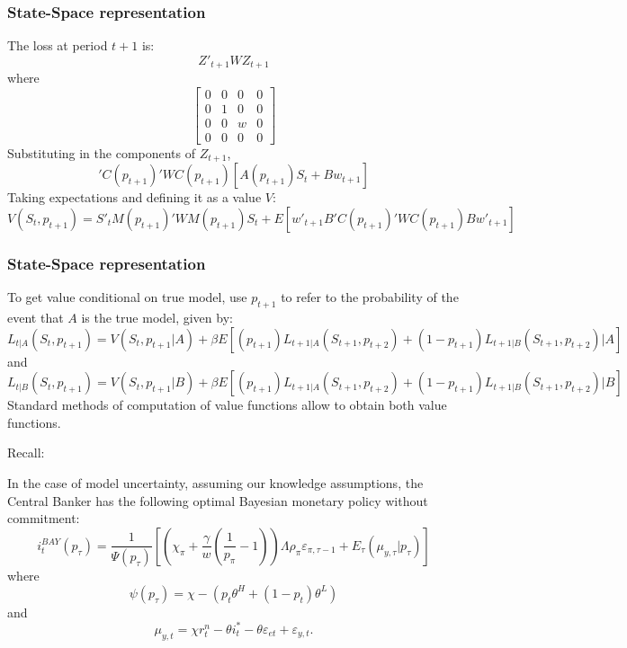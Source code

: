 \documentclass{beamer}
\begin{document}
\begin{frame}
\frametitle{State-Space representation} 
The loss at period $t+1$ is:
\begin{equation}
Z'_{t+1} W Z_{t+1}
\end{equation}
where
\begin{equation}
\begin{bmatrix}
0 & 0 & 0 & 0 \\
0 & 1 & 0 & 0 \\
0 & 0 & w & 0 \\
0 & 0 & 0 & 0
\end{bmatrix}
\end{equation}
Substituting in the components of $Z_{t+1}$,
\begin{equation}
[A ( p_{t+1}) S_t + B w_{t+1}]' C(p_{t+1})' W C (p_{t+1}) [A(p_{t+1}) S_t + B w_{t+1}]
\end{equation}
Taking expectations and defining it as a value $V$:
\small
\begin{equation}
V(S_t, p_{t+1}) = S'_t M (p_{t+1})' W M (p_{t+1}) S_t + E \left [w'_{t+1} B' C (p_{t+1})' W C (p_{t+1}) B w'_{t+1} \right ]
\end{equation}
\end{frame}

\begin{frame}
\frametitle{State-Space representation} 
To get value conditional on true model, use $p_{t+1}$ to refer to the
probability of the event that $A$ is the true model, given by:
\tiny
\begin{equation}
L_{t|A} (S_t,p_{t+1}) = V(S_t,p_{t+1}|A) + \beta E \left [(p_{t+1}) L_{t+1|A} (S_{t+1},p_{t+2}) + (1-p_{t+1}) L_{t+1|B} (S_{t+1},p_{t+2})|A \right ]
\end{equation}
\small and
\tiny
\begin{equation}
L_{t|B} (S_t,p_{t+1}) = V(S_t,p_{t+1}|B) + \beta E \left [(p_{t+1}) L_{t+1|A} (S_{t+1},p_{t+2}) + (1-p_{t+1}) L_{t+1|B} (S_{t+1},p_{t+2})|B \right ]
\end{equation}
\small
Standard methods of computation of value functions allow to obtain both value
functions.
\end{frame}

\begin{frame}
Recall:
\begin{theorem}
 In the case of model uncertainty, assuming our knowledge assumptions, the
 Central Banker has the following optimal Bayesian monetary policy without
 commitment:
\begin{equation}
i_t^{BAY} (p_\tau) = \frac{1}{\Psi (p_\tau)} \left [ \left ( \chi_\pi + \frac{\gamma}{w} (\frac{1}{p_\pi} - 1 ) \right ) \Lambda \rho_\pi \varepsilon_{\pi,\tau-1} + E_\tau (\mu_{y,\tau}|p_\tau) \right ]
\end{equation}
where
\begin{equation}
\psi(p_\tau) = \chi - \left (p_t \theta^H + (1-p_t) \theta^L \right )
\end{equation}
and
\begin{equation}
\mu_{y,t} = \chi r_t^n - \theta i_t^* - \theta \varepsilon_{et} +
\varepsilon_{y,t}.
\end{equation}
\end{theorem}
\end{frame}
\end{document}
